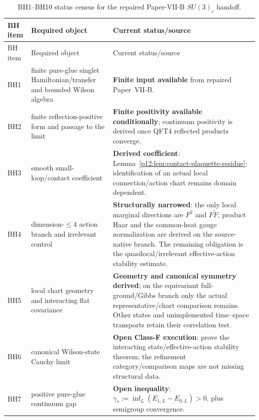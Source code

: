 \documentclass[12pt,a4paper]{article}
\begin{document}
\begin{longtable}{>{\raggedright\arraybackslash}p{} >{\raggedright\arraybackslash}p{} >{\raggedright\arraybackslash}p{}}
\caption[\texorpdfstring{BH1--BH10 status census for the repaired Paper-VII-B \(SU(3)_c\) handoff}{BH1--BH10 status census for the repaired Paper-VII-B SU(3)c handoff}]{BH1--BH10 status census for the repaired Paper-VII-B \(SU(3)_c\) handoff.}\label{p12:tab:bh1-bh10-su3-discharge-census}\\
\toprule
BH item & Required object & Current status/source \\
\midrule
\endfirsthead
\toprule
BH item & Required object & Current status/source \\
\midrule
\endhead
BH1 & finite pure-glue singlet Hamiltonian/transfer and bounded Wilson algebra & \textbf{Finite input available} from repaired Paper~VII-B. \\
BH2 & finite reflection-positive form and passage to the limit & \textbf{Finite positivity available conditionally}; continuum positivity is derived once QFT4 reflected products converge. \\
BH3 & smooth small-loop/contact coefficient & \textbf{Derived coefficient}: Lemma~\ref{p12:lem:contact-plaquette-residue}; identification of an actual local connection/action chart remains domain dependent. \\
BH4 & dimension-\(\le4\) action branch and irrelevant control & \textbf{Structurally narrowed}: the only local marginal directions are \(F^2\) and \(F\widetilde F\); product Haar and the common-heat gauge normalization are derived on the source-native branch.  The remaining obligation is the quasilocal/irrelevant effective-action stability estimate. \\
BH5 & local chart geometry and interacting flat covariance & \textbf{Geometry and canonical symmetry derived}; on the equivariant full-ground/Gibbs branch only the actual representative/chart comparison remains. Other states and unimplemented time--space transports retain their correlation test. \\
BH6 & canonical Wilson-state Cauchy limit & \textbf{Open Class-F execution}: prove the interacting state/effective-action stability theorem; the refinement category/comparison maps are not missing structural data. \\
BH7 & positive pure-glue continuum gap & \textbf{Open inequality}: \(\gamma_*:=\inf_L(E_{1,L}-E_{0,L})>0\), plus semigroup convergence. \\

\end{longtable}
\end{document}
